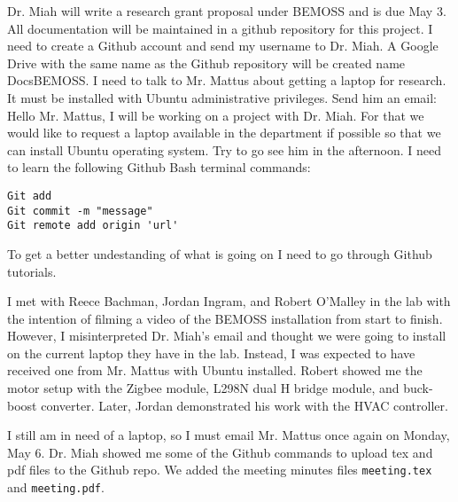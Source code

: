 \documentclass[fontsize=11pt, %
                             paper=letter, %
                             twoside, %
                             captions=tableheading,
                             index=totoc,
                             hyperref]{labbook}
\begin{document}
\begin{addmargin}[0cm]{0cm}
Dr. Miah will write a research grant proposal under BEMOSS and is due May 3.
\bigbreak\noindent
All documentation will be maintained in a github repository for this project.
I need to create a Github account and send my username to Dr. Miah. A Google Drive with the same name as the Github repository will be created name DocsBEMOSS.
\bigbreak\noindent
I need to talk to Mr. Mattus about getting a laptop for research. It must be installed with Ubuntu administrative privileges. 
\bigbreak\noindent
Send him an email:
\bigbreak\noindent
Hello Mr. Mattus, I will be working on a project with Dr. Miah. For that we would like to request a laptop available in the department if possible so that we can install Ubuntu operating system. 
\bigbreak\noindent
Try to go see him in the afternoon.
\bigbreak\noindent
I need to learn the following Github Bash terminal commands:
\begin{verbatim}
Git add
Git commit -m "message"
Git remote add origin 'url'
\end{verbatim}
To get a better undestanding of what is going on I need to go through Github tutorials.

I met with Reece Bachman, Jordan Ingram, and Robert O'Malley in the lab with the intention of filming a video of the BEMOSS installation from start to finish. However, I misinterpreted Dr. Miah's email and thought we were going to install on the current laptop they have in the lab. Instead, I was expected to have received one from Mr. Mattus with Ubuntu installed. Robert showed me the motor setup with the Zigbee module, L298N dual H bridge module, and buck-boost converter. Later, Jordan demonstrated his work with the HVAC controller.

I still am in need of a laptop, so I must email Mr. Mattus once again on Monday, May 6.
\bigbreak\noindent
Dr. Miah showed me some of the Github commands to upload tex and pdf files to the Github repo. We added the meeting minutes files \texttt{meeting.tex} and \texttt{meeting.pdf}.
\end{addmargin}

\end{document}
